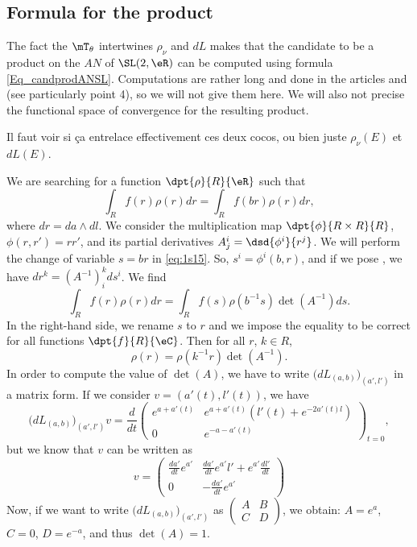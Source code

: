 \subsection{Formula for the product}

The fact the $\mT_{\theta}$ intertwines $\rho_{\nu}$ and $dL$ makes that the candidate to be a product on the $AN$ of $\SL(2,\eR)$ can be computed using formula \eqref{Eq_candprodANSL}. Computations are rather long and done in the articles \cite{StrictSolvableSym} and \cite{Biel-Massar} (see particularly point 4), so we will not give them here. We will also not precise the functional space of convergence for the resulting product.

\begin{probleme}
	Il faut voir si ça entrelace effectivement ces deux cocos, ou bien juste $\rho_{\nu}(E)$ et $dL(E)$.
	\label{Probintertw}
\end{probleme}

We are searching for a function $\dpt{\rho}{R}{\eR}$ such that
\begin{equation}\label{eq:1s15}
	\int_Rf(r)\rho(r)dr=\int_Rf(br)\rho(r)dr,
\end{equation}
where $dr=da\wedge dl$. We consider the multiplication map $\dpt{\phi}{R\times R}{R}$, $\phi(r,r')=rr'$, and its partial derivatives $A^i_j=\dsd{\phi^i}{r^j}$.  We will perform the change of variable $ s =br$ in \eqref{eq:1s15}. So, $ s^i=\phi^i(b,r)$, and if we pose , we have $dr^k=(A^{-1})^k_id s^i$. We find
\[
	\int_Rf(r)\rho(r)dr=\int_Rf( s)\rho(b^{-1} s)\det(A^{-1})d s.
\]
In the right-hand side, we rename $ s$ to $r$ and we impose the equality to be correct for all functions $\dpt{f}{R}{\eC}$. Then for all $r$, $k\in R$,
\[
	\rho(r)=\rho(k^{-1} r)\det(A^{-1}).
\]
In order to compute the value of $\det(A)$, we have to write $\big(dL_{(a,b)}\big)_{(a',l')}$ in a matrix form. If we consider $v=(a'(t),l'(t))$, we have
\begin{equation}
	\big(dL_{(a,b)}\big)_{(a',l')}v=\frac{d}{dt}\begin{pmatrix}
		e^{a+a'(t)} & e^{a+a'(t)}(l'(t)+e^{-2a'(t)l}) \\
		0           & e^{-a-a'(t)}
	\end{pmatrix}_{t=0},
\end{equation}
but we know that $v$ can be written as
\[
	v=\begin{pmatrix}
		\frac{da'}{dt}e^{a'} & \frac{da'}{dt}e^{a'}l'+e^{a'}\frac{dl'}{dt} \\
		0                    & -\frac{da'}{dt}e^{a'}
	\end{pmatrix}
\]
Now, if we want to write $\big(dL_{(a,b)}\big)_{(a',l')}$ as $\begin{pmatrix}A&B\\C&D\end{pmatrix}$, we obtain: $A=e^a$, $C=0$, $D=e^{-a}$, and thus $\det(A)=1$.

